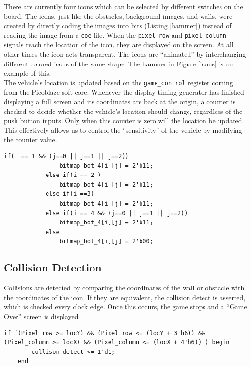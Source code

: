 \documentclass[11pt]{article}
\begin{document}
		There are currently four icons which can be selected by different switches on the board. The icons, just like the obstacles, background images, and walls, were created by directly coding the images into bits (Listing \ref{hammer}) instead of reading the image from a \texttt{coe} file. When the \texttt{pixel\_row} and \texttt{pixel\_column} signals reach the location of the icon, they are displayed on the screen. At all other times the icon acts transparent. The icons are ``animated'' by interchanging different colored icons of the same shape. The hammer in Figure \ref{icons} is an example of this.  \\
\hspace{12pt} The vehicle's location is updated based on the \texttt{game\_control} register coming from the Picoblaze soft core. Whenever the display timing generator has finished displaying a full screen and its coordinates are back at the origin, a counter is checked to decide whether the vehicle's location should change, regardless of the push button inputs.  Only when this counter is zero will the location be updated.  This effectively allows us to control the ``sensitivity'' of the vehicle by modifying the counter value. 

\begin{lstlisting}[caption=Example Icon creation (hammer), label=hammer]		
			if(i == 1 && (j==0 || j==1 || j==2))
				bitmap_bot_4[i][j] = 2'b11;			
			else if(i == 2 )
				bitmap_bot_4[i][j] = 2'b11;	
			else if(i ==3)
				bitmap_bot_4[i][j] = 2'b11;			
			else if(i == 4 && (j==0 || j==1 || j==2))
				bitmap_bot_4[i][j] = 2'b11;						
			else
				bitmap_bot_4[i][j] = 2'b00;	
 \end{lstlisting}



\subsection{Collision Detection}	
		Collisions are detected by comparing the coordinates of the wall or obstacle with the coordinates of the icon.  If they are equivalent, the collision detect is asserted, which is checked every clock edge. Once this occurs, the game stops and a ``Game Over'' screen is displayed.  

\begin{lstlisting}[caption=Collision Detection Logic, label=collision]		
	if ((Pixel_row >= locY) && (Pixel_row <= (locY + 3'h6)) && (Pixel_column >= locX) && (Pixel_column <= (locX + 4'h6)) ) begin
		collison_detect <= 1'd1;
	end	
 \end{lstlisting}
 
\end{document}
